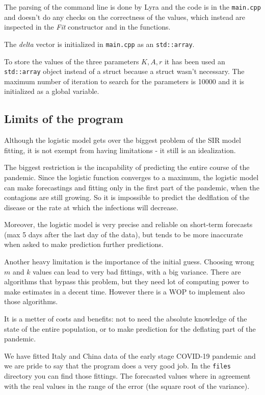 The parsing of the command line is done by Lyra and the code is in the \verb!main.cpp! and doesn't do any checks on the correctness of the values, which instead are inspected in the \emph{Fit} constructor and in the functions. 

The \emph{delta} vector is initialized in \verb!main.cpp! as an \verb!std::array!. 

To store the values of the three parameters $K, A, r$ it has been used an \verb!std::array! object instead of a struct because a struct wasn't necessary. The maximum number of iteration to search for the parameters is 10000 and it is initialized as a global variable.

\subsection{Limits of the program}

Although the logistic model gets over the biggest problem of the SIR model fitting, it is not exempt from having limitations - it still is an idealization.

The biggest restriction is the incapability of predicting the entire course of the pandemic. Since the logistic function converges to a maximum, the logistic model can make forecastings and fitting only in the first part of the pandemic, when the contagions are still growing. So it is impossible to predict the dedflation of the disease or the rate at which the infections will decrease.

Moreover, the logistic model is very precise and reliable on short-term forecasts (max 5 days after the last day of the data), but tends to be more inaccurate when asked to make prediction further predictions.

Another heavy limitation is the importance of the initial guess. Choosing wrong $m$ and $k$ values can lead to very bad fittings, with a big variance. There are algorithms that bypass this problem, but they need lot of computing power to make estimates in a decent time. However there is a WOP to implement also those algorithms.

It is a metter of costs and benefits: not to need the absolute knowledge of the state of the entire population, or to make prediction for the deflating part of the pandemic.

We have fitted Italy and China data of the early stage COVID-19 pandemic and we are pride to say that the program does a very good job. In the \verb!files! directory you can find those fittings. The forecasted values where in agreement with the real values in the range of the error (the square root of the variance).